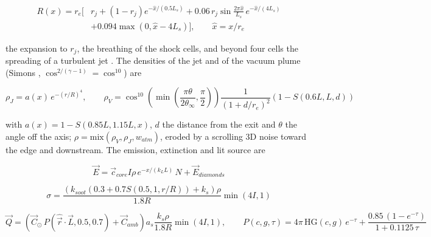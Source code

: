 \documentclass[Orbiter Technical Reference.tex]{subfiles}
\begin{document}
\begin{sloppypar}
\begin{align*}
R(x) = r_{e}\Big[ & r_{j} + (1 - r_{j})e^{-\hat{x}/(0.5L_{s})} + 0.06\,r_{j}\sin\frac{2\pi\hat{x}}{L_{s}}\,e^{-\hat{x}/(4L_{s})} \\
& + 0.094\max(0, \hat{x} - 4L_{s}) \Big], \qquad \hat{x} = x/r_{e}
\end{align*}

\noindent
the expansion to $r_{j}$, the breathing of the shock cells, and beyond four cells the spreading of a turbulent jet \cite{pope2000}. The densities of the jet and of the vacuum plume (Simons \cite{simons1972}, $\cos^{2/(\gamma-1)} = \cos^{10}$) are

\[ \rho_{J} = a(x)\,e^{-(r/R)^{4}}, \qquad \rho_{V} = \cos^{10}\left(\min\left(\frac{\pi\theta}{2\theta_{\infty}}, \frac{\pi}{2}\right)\right) \frac{1}{(1 + d/r_{e})^{2}} \left(1 - S(0.6L, L, d)\right) \]

\noindent
with $a(x) = 1 - S(0.85L, 1.15L, x)$, $d$ the distance from the exit and $\theta$ the angle off the axis; $\rho = \mathrm{mix}(\rho_{V}, \rho_{J}, w_{atm})$, eroded by a scrolling 3D noise toward the edge and downstream. The emission, extinction and lit source are

\[ \vec{E} = \vec{c}_{core} I \rho\, e^{-x/(k_{L}L)}\, N + \vec{E}_{diamonds} \]

\[ \sigma = \frac{(k_{soot}(0.3 + 0.7S(0.5, 1, r/R)) + k_{s})\rho}{1.8R}\min(4I, 1) \]

\[ \vec{Q} = \left(\vec{C}_{\odot}\,P(\hat{\vec{r}}\cdot\vec{L}, 0.5, 0.7) + \vec{C}_{amb}\right) a_{s}\frac{k_{s}\rho}{1.8R}\min(4I, 1), \qquad P(c, g, \tau) = 4\pi\,\mathrm{HG}(c, g)\,e^{-\tau} + \frac{0.85\,(1 - e^{-\tau})}{1 + 0.1125\,\tau} \]


\end{sloppypar}
\end{document}
